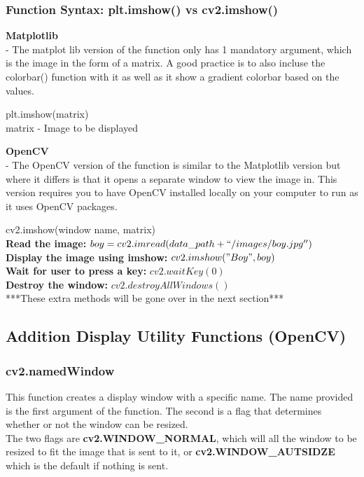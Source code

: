 \documentclass[fleqn]{article}
\begin{document}
    \subsubsection{Function Syntax: plt.imshow() vs cv2.imshow()}
    \indent \textbf{Matplotlib}\\
    \indent \indent - The matplot lib version of the function only has 1 mandatory argument, which is the image in the form of a matrix. A good practice is to also incluse the colorbar() function with it as well as it show a gradient colorbar based on the values.

    \begin{center}
      plt.imshow(matrix)\\
      matrix - Image to be displayed
    \end{center}

    \newpage
    \clearpage

    \textbf{OpenCV}\\
    \indent \indent - The OpenCV version of the function is similar to the Matplotlib version but where it differs is that it opens a separate window to view the image in. This version requires you to have OpenCV installed locally on your computer to run as it uses OpenCV packages.



    \begin{center}
      cv2.imshow(window name, matrix)\\
      \textbf{Read the image:} $boy = cv2.imread(data\_path + ``/images/boy.jpg'')$\\
      \textbf{Display the image using imshow: } $cv2.imshow("Boy", boy)$\\
      \textbf{Wait for user to press a key: } $cv2.waitKey(0)$\\
      \textbf{Destroy the window: } $cv2.destroyAllWindows()$\\
      ***These extra methods will be gone over in the next section***
    \end{center}

    \subsection{Addition Display Utility Functions (OpenCV)}
    \subsubsection{cv2.namedWindow}
    This function creates a display window with a specific name. The name provided is the first argument of the function. The second is a flag that determines whether or not the window can be resized. \\
    The two flags are \textbf{cv2.WINDOW\_NORMAL}, which will all the window to be resized to fit the image that is sent to it, or \textbf{cv2.WINDOW\_AUTSIDZE} which is the default if nothing is sent.
\end{document}
